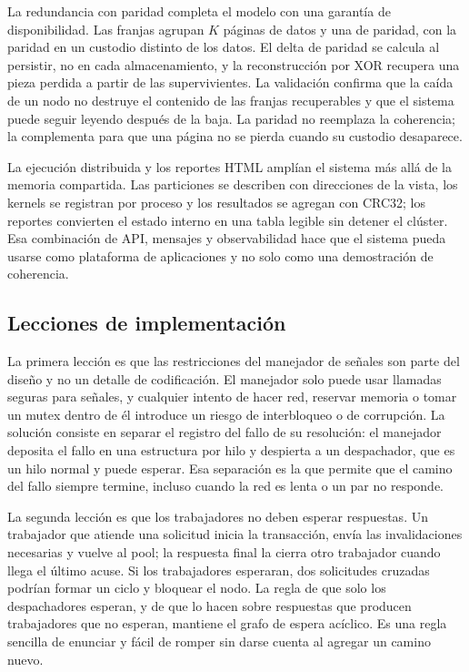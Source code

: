 La redundancia con paridad completa el modelo con una garantía de disponibilidad. Las franjas agrupan $K$ páginas de datos y una de paridad, con la paridad en un custodio distinto de los datos. El delta de paridad se calcula al persistir, no en cada almacenamiento, y la reconstrucción por XOR recupera una pieza perdida a partir de las supervivientes. La validación confirma que la caída de un nodo no destruye el contenido de las franjas recuperables y que el sistema puede seguir leyendo después de la baja. La paridad no reemplaza la coherencia; la complementa para que una página no se pierda cuando su custodio desaparece.

La ejecución distribuida y los reportes HTML amplían el sistema más allá de la memoria compartida. Las particiones se describen con direcciones de la vista, los kernels se registran por proceso y los resultados se agregan con CRC32; los reportes convierten el estado interno en una tabla legible sin detener el clúster. Esa combinación de API, mensajes y observabilidad hace que el sistema pueda usarse como plataforma de aplicaciones y no solo como una demostración de coherencia.

\subsection{Lecciones de implementación}

La primera lección es que las restricciones del manejador de señales son parte del diseño y no un detalle de codificación. El manejador solo puede usar llamadas seguras para señales, y cualquier intento de hacer red, reservar memoria o tomar un mutex dentro de él introduce un riesgo de interbloqueo o de corrupción. La solución consiste en separar el registro del fallo de su resolución: el manejador deposita el fallo en una estructura por hilo y despierta a un despachador, que es un hilo normal y puede esperar. Esa separación es la que permite que el camino del fallo siempre termine, incluso cuando la red es lenta o un par no responde.

La segunda lección es que los trabajadores no deben esperar respuestas. Un trabajador que atiende una solicitud inicia la transacción, envía las invalidaciones necesarias y vuelve al pool; la respuesta final la cierra otro trabajador cuando llega el último acuse. Si los trabajadores esperaran, dos solicitudes cruzadas podrían formar un ciclo y bloquear el nodo. La regla de que solo los despachadores esperan, y de que lo hacen sobre respuestas que producen trabajadores que no esperan, mantiene el grafo de espera acíclico. Es una regla sencilla de enunciar y fácil de romper sin darse cuenta al agregar un camino nuevo.

